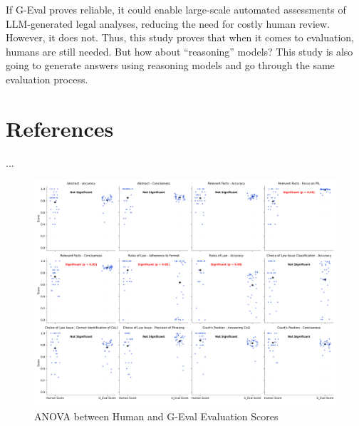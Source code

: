 \documentclass[a4paper,12pt]{article}
\begin{document}
If G-Eval proves reliable, it could enable large-scale automated assessments of LLM-generated legal analyses, reducing the need for costly human review. However, it does not. Thus, this study proves that when it comes to evaluation, humans are still needed. But how about ``reasoning'' models? This study is also going to generate answers using reasoning models and go through the same evaluation process.

\section*{References}
...

\begin{figure}[htp]
\centering
\includegraphics[width=14cm]{metric_anova_comparison.png}
\caption{ANOVA between Human and G-Eval Evaluation Scores}
\label{fig:image}
\end{figure}
\end{document}

